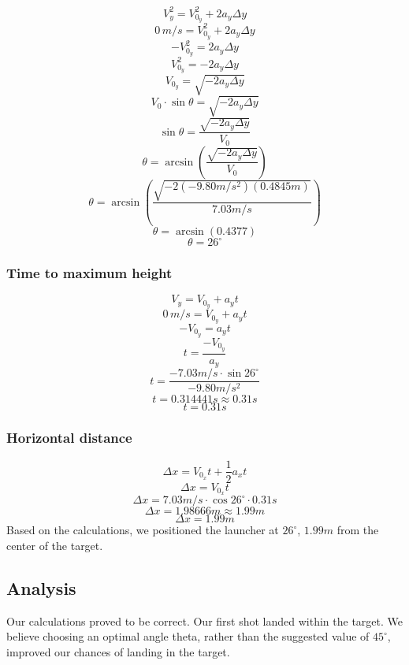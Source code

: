 \documentclass[11pt, letterpaper, includehead]{article}
\begin{document}
$$V_y^2 = V_{0_y}^2 + 2a_y\Delta y$$
$$0\,m/s = V_{0_y}^2 + 2a_y\Delta y$$
$$-V_{0_y}^2 = 2a_y\Delta y$$
$$V_{0_y}^2 = -2a_y\Delta y$$
$$V_{0_y} = \sqrt{-2a_y\Delta y}$$
$$V_0\cdot\sin\theta = \sqrt{-2a_y\Delta y}$$
$$\sin\theta = \frac{\sqrt{-2a_y\Delta y}}{V_0}$$
$$\theta = \arcsin\left(\frac{\sqrt{-2a_y\Delta y}}{V_0}\right)$$
$$\theta = \arcsin\left(\frac{\sqrt{-2(-9.80m/s^2)(0.4845m)}}{7.03m/s}\right)$$
$$\theta = \arcsin(0.4377)$$
$$\boxed{\theta = 26^{\circ}}$$

\subsubsection{Time to maximum height} %
$$V_y = V_{0_y} + a_yt$$
$$0\,m/s = V_{0_y} + a_yt$$
$$-V_{0_y} = a_yt$$
$$t = \frac{-V_{0_y}}{a_y}$$
$$t = \frac{-7.03m/s\cdot\sin26^{\circ}}{-9.80m/s^2}$$
$$t = 0.314441s \approx 0.31s$$
$$\boxed{t = 0.31s}$$

\subsubsection{Horizontal distance} %
$$\Delta x = V_{0_x}t + \frac{1}{2}a_xt$$
$$\Delta x = V_{0_x}t$$
$$\Delta x = 7.03m/s\cdot \cos26^{\circ}\cdot 0.31s$$
$$\Delta x = 1.98666m \approx 1.99m$$
$$\boxed{\Delta x = 1.99m}$$
Based on the calculations, we positioned the launcher at $26^{\circ}$, $1.99m$ from the center
of the target.

\subsection{Analysis}  %
Our calculations proved to be correct. Our first shot landed within the target.
We believe choosing an optimal angle theta, rather than the suggested value of 
$45^{\circ}$, improved our chances of landing in the target.
\end{document}
